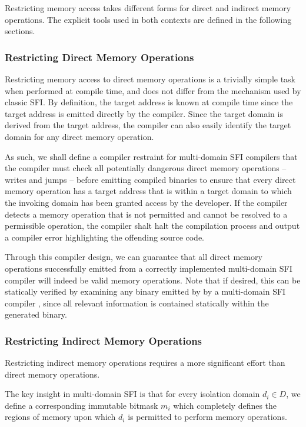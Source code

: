 \documentclass[12pt]{article}
\begin{document}
Restricting memory access takes different forms for direct and indirect memory operations. The explicit tools used in both contexts are defined in the following sections.

\subsubsection{Restricting Direct Memory Operations}

Restricting memory access to direct memory operations is a trivially simple task when performed at compile time, and does not differ from the mechanism used by classic SFI. By definition, the target address is known at compile time since the target address is emitted directly by the compiler. Since the target domain is derived from the target address, the compiler can also easily identify the target domain for any direct memory operation.

As such, we shall define a compiler restraint for multi-domain SFI compilers that the compiler must check all potentially dangerous direct memory operations -- writes and jumps -- before emitting compiled binaries to ensure that every direct memory operation has a target address that is within a target domain to which the invoking domain has been granted access by the developer. If the compiler detects a memory operation that is not permitted and cannot be resolved to a permissible operation, the compiler shalt halt the compilation process and output a compiler error highlighting the offending source code.

Through this compiler design, we can guarantee that all direct memory operations successfully emitted from a correctly implemented multi-domain SFI compiler will indeed be valid memory operations. Note that if desired, this can be statically verified by examining any binary emitted by by a multi-domain SFI compiler \cite{yee_native_2009}, since all relevant information is contained statically within the generated binary.

\subsubsection{Restricting Indirect Memory Operations}

Restricting indirect memory operations requires a more significant effort than direct memory operations.

The key insight in multi-domain SFI is that for every isolation domain $d_i \in D$, we define a corresponding immutable bitmask $m_i$ which completely defines the regions of memory upon which $d_i$ is permitted to perform memory operations.
\end{document}
